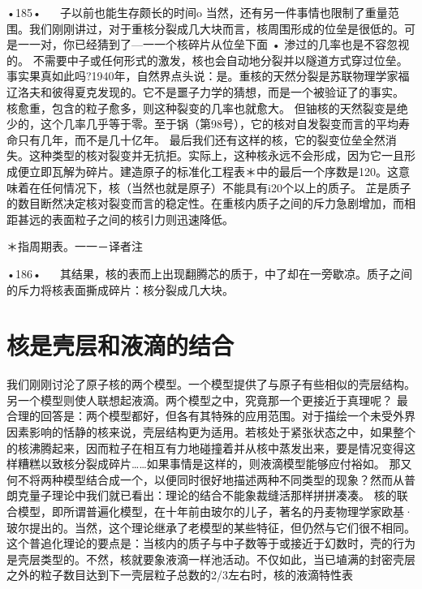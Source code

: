 •185•
  
子以前也能生存颇长的时间o
当然，还有另一件事情也限制了重量范围。我们刚刚讲过，对于重核分裂成几大块而言，核周围形成的位垒是很低的。可是一一对，你已经猜到了—一一个核碎片从位垒下面
•	渗过的几率也是不容忽视的。
不需要中子或任何形式的激发，核也会自动地分裂并以隧道方式穿过位垒。事实果真如此吗?1940年，自然界点头说：是。重核的天然分裂是苏联物理学家福辽洛夫和彼得夏克发现的。它不是噩子力学的猜想，而是一个被验证了的事实。
核愈重，包含的粒子愈多，则这种裂变的几率也就愈大。
但铀核的天然裂变是绝少的，这个几率几乎等于零。至于锅（第98号），它的核对自发裂变而言的平均寿命只有几年，而不是几十亿年。
最后我们还有这样的核，它的裂变位垒全然消失。这种类型的核对裂变并无抗拒。实际上，这种核永远不会形成，因为它一且形成便立即瓦解为碎片。建造原子的标准化工程表＊中的最后一个序数是120。这意味着在任何情况下，核（当然也就是原子）不能具有i20个以上的质子。
芷是质子的数目断然决定核对裂变而言的稳定性。在重核内质子之间的斥力急剧增加，而相距甚远的表面粒子之间的核引力则迅速降低。

＊指周期表。一一－译者注

•186•
  
其结果，核的表而上出现翻腾芯的质于，中了却在一旁歇凉。质子之间的斥力将核表面撕成碎片：核分裂成几大块。

\section{核是壳层和液滴的结合}

我们刚刚讨沦了原子核的两个模型。一个模型提供了与原子有些相似的壳层结构。另一个模型则使人联想起液滴。两个模型之中，究竟那一个更接近于真理呢？
最合理的回答是：两个模型都好，但各有其特殊的应用范围。对于描绘一个未受外界因素影响的恬静的核来说，壳层结构更为适用。若核处于紧张状态之中，如果整个的核沸腾起来，因而粒子在相互有力地碰撞着并从核中蒸发出来，要是情况变得这样糟糕以致核分裂成碎片……如果事情是这样的，则液滴模型能够应付裕如。
那又何不将两种模型结合成一个，以便同时很好地描述两种不同类型的现象？然而从普朗克量子理论中我们就已看出：理论的结合不能象裁缝活那样拼拼凑凑。
核的联合模型，即所谓普遍化模型，在十年前由玻尔的儿子，著名的丹麦物理学家欧基·玻尔提出的。当然，这个理论继承了老模型的某些特征，但仍然与它们很不相同。
这个普追化理论的要点是：当核内的质子与中子数等于或接近于幻数时，壳的行为是壳层类型的。不然，核就要象液滴一样池活动。不仅如此，当已埴满的封密壳层之外的粒子数目达到下一壳层粒子总数的2/3左右时，核的液滴特性表

